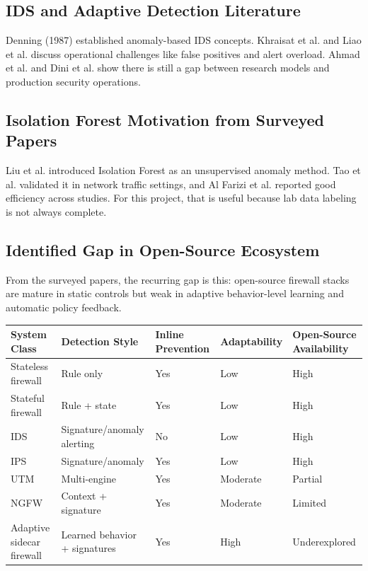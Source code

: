 \documentclass[12pt,a4paper]{article}
\begin{document}
\subsection{IDS and Adaptive Detection Literature}

Denning (1987) established anomaly-based IDS concepts. Khraisat et al. and Liao et al. discuss operational challenges like false positives and alert overload. Ahmad et al. and Dini et al. show there is still a gap between research models and production security operations.

\subsection{Isolation Forest Motivation from Surveyed Papers}

Liu et al. introduced Isolation Forest as an unsupervised anomaly method. Tao et al. validated it in network traffic settings, and Al Farizi et al. reported good efficiency across studies. For this project, that is useful because lab data labeling is not always complete.

\subsection{Identified Gap in Open-Source Ecosystem}

From the surveyed papers, the recurring gap is this: open-source firewall stacks are mature in static controls but weak in adaptive behavior-level learning and automatic policy feedback.

\begin{table}[h!]
\centering
\begin{tabular}{lllll}
\toprule
System Class & Detection Style & Inline Prevention & Adaptability & Open-Source Availability \\
\midrule
Stateless firewall & Rule only & Yes & Low & High \\
Stateful firewall & Rule + state & Yes & Low & High \\
IDS & Signature/anomaly alerting & No & Low & High \\
IPS & Signature/anomaly & Yes & Low & High \\
UTM & Multi-engine & Yes & Moderate & Partial \\
NGFW & Context + signature & Yes & Moderate & Limited \\
Adaptive sidecar firewall & Learned behavior + signatures & Yes & High & Underexplored \\
\bottomrule
\end{tabular}
\end{table}
\end{document}
